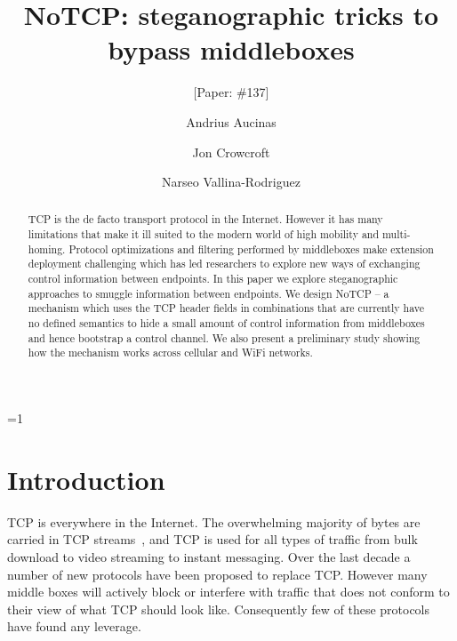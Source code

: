 \documentclass{sig-alternate-10pt}
\def\anon{1}        %
\begin{document}
\date{}


\title{NoTCP: steganographic tricks to bypass middleboxes}
\ifnum\anon=1
\author{[Paper: \#137]}%
\else
{}
\author{
\alignauthor Andrius Aucinas\\
\and
\alignauthor Jon Crowcroft\\
\and
\alignauthor Narseo Vallina-Rodriguez\\
}
\fi

    
\maketitle
\begin{abstract}
TCP is the de facto transport protocol in the Internet. However it has many limitations that make it ill suited to the modern world of high mobility and multi-homing. Protocol optimizations and filtering performed by middleboxes make extension deployment challenging which has led researchers to explore new ways of exchanging control information between endpoints. In this paper we explore steganographic approaches to smuggle information between endpoints. We design NoTCP -- a mechanism which uses the TCP header fields in combinations that are currently have no defined semantics to hide a small amount of control information from middleboxes and hence bootstrap a control channel. We also present a preliminary study showing how the mechanism works across cellular and WiFi networks.
\end{abstract} 

\section{Introduction}
\label{section:intro}

TCP is everywhere in the Internet. The overwhelming majority of bytes are carried in TCP streams~\cite{John:2007dv}, and TCP is used for all types of traffic from bulk download to video streaming to instant messaging. Over the last decade a number of new protocols have been proposed to replace TCP. However many middle boxes will actively block or interfere with traffic that does not conform to their view of what TCP should look like. Consequently few of these protocols have found any leverage.
\end{document}
